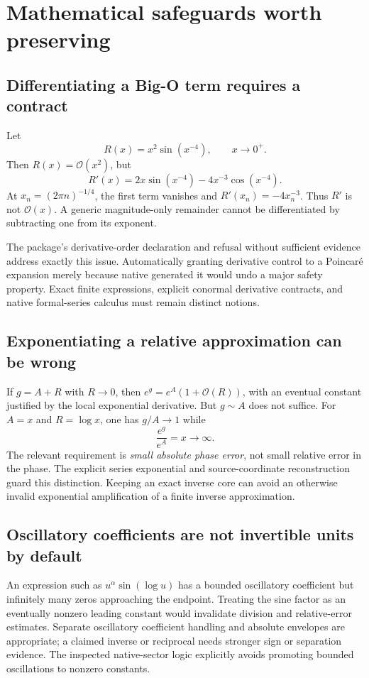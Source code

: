 \documentclass[11pt,letterpaper]{article}
\newcommand{\code}[1]{\texttt{\detokenize{#1}}}
\newcommand{\OO}{\mathcal{O}}
\begin{document}
\section{Mathematical safeguards worth preserving}
\subsection{Differentiating a Big-O term requires a contract}
Let
\begin{equation}
 R(x)=x^2\sin(x^{-4}),\qquad x\to0^+.
\end{equation}
Then $R(x)=\OO(x^2)$, but
\begin{equation}
 R'(x)=2x\sin(x^{-4})-4x^{-3}\cos(x^{-4}).
\end{equation}
At $x_n=(2\pi n)^{-1/4}$, the first term vanishes and $R'(x_n)=-4x_n^{-3}$. Thus $R'$ is not $\OO(x)$. A generic magnitude-only remainder cannot be differentiated by subtracting one from its exponent.

The package's derivative-order declaration and refusal without sufficient evidence address exactly this issue. Automatically granting derivative control to a Poincar\'e expansion merely because native \code{Series} generated it would undo a major safety property. Exact finite expressions, explicit conormal derivative contracts, and native formal-series calculus must remain distinct notions.\cite{operations,native,guide}

\subsection{Exponentiating a relative approximation can be wrong}
If $g=A+R$ with $R\to0$, then $e^g=e^A(1+\OO(R))$, with an eventual constant justified by the local exponential derivative. But $g\sim A$ does not suffice. For $A=x$ and $R=\log x$, one has $g/A\to1$ while
\begin{equation}
 \frac{e^g}{e^A}=x\to\infty.
\end{equation}
The relevant requirement is \emph{small absolute phase error}, not small relative error in the phase. The explicit series exponential and source-coordinate reconstruction guard this distinction. Keeping an exact inverse core can avoid an otherwise invalid exponential amplification of a finite inverse approximation.\cite{operations,source-coordinates}

\subsection{Oscillatory coefficients are not invertible units by default}
An expression such as $u^\alpha\sin(\log u)$ has a bounded oscillatory coefficient but infinitely many zeros approaching the endpoint. Treating the sine factor as an eventually nonzero leading constant would invalidate division and relative-error estimates. Separate oscillatory coefficient handling and absolute envelopes are appropriate; a claimed inverse or reciprocal needs stronger sign or separation evidence. The inspected native-sector logic explicitly avoids promoting bounded oscillations to nonzero constants.\cite{native}
\end{document}
